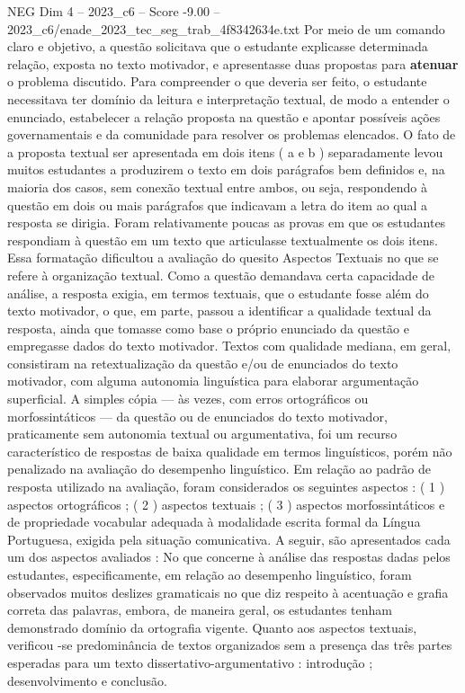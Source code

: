 \begin{textsample}{NEG Dim 4 – 2023\_c6 – Score -9.00 – 2023\_c6/enade\_2023\_tec\_seg\_trab\_4f8342634e.txt}
Por meio de um comando claro e objetivo, a questão solicitava que o estudante explicasse determinada relação, exposta no texto motivador, e apresentasse duas propostas para \textbf{atenuar} o problema discutido.
Para compreender o que deveria ser feito, o estudante necessitava ter domínio da leitura e interpretação textual, de modo a entender o enunciado, estabelecer a relação proposta na questão e apontar possíveis ações governamentais e da comunidade para resolver os problemas elencados.
O fato de a proposta textual ser apresentada em dois itens ( a e b ) separadamente levou muitos estudantes a produzirem o texto em dois parágrafos bem definidos e, na maioria dos casos, sem conexão textual entre ambos, ou seja, respondendo à questão em dois ou mais parágrafos que indicavam a letra do item ao qual a resposta se dirigia.
Foram relativamente poucas as provas em que os estudantes respondiam à questão em um texto que articulasse textualmente os dois itens.
Essa formatação dificultou a avaliação do quesito Aspectos Textuais no que se refere à organização textual.
Como a questão demandava certa capacidade de análise, a resposta exigia, em termos textuais, que o estudante fosse além do texto motivador, o que, em parte, passou a identificar a qualidade textual da resposta, ainda que tomasse como base o próprio enunciado da questão e empregasse dados do texto motivador.
Textos com qualidade mediana, em geral, consistiram na retextualização da questão e/ou de enunciados do texto motivador, com alguma autonomia linguística para elaborar argumentação superficial.
A simples cópia — às vezes, com erros ortográficos ou morfossintáticos — da questão ou de enunciados do texto motivador, praticamente sem autonomia textual ou argumentativa, foi um recurso característico de respostas de baixa qualidade em termos linguísticos, porém não penalizado na avaliação do desempenho linguístico.
Em relação ao padrão de resposta utilizado na avaliação, foram considerados os seguintes aspectos : ( 1 ) aspectos ortográficos ; ( 2 ) aspectos textuais ; ( 3 ) aspectos morfossintáticos e de propriedade vocabular adequada à modalidade escrita formal da Língua Portuguesa, exigida pela situação comunicativa.
A seguir, são apresentados cada um dos aspectos avaliados : No que concerne à análise das respostas dadas pelos estudantes, especificamente, em relação ao desempenho linguístico, foram observados muitos deslizes gramaticais no que diz respeito à acentuação e grafia correta das palavras, embora, de maneira geral, os estudantes tenham demonstrado domínio da ortografia vigente.
Quanto aos aspectos textuais, verificou -se predominância de textos organizados sem a presença das três partes esperadas para um texto dissertativo-argumentativo : introdução ; desenvolvimento e conclusão.

\end{textsample}
